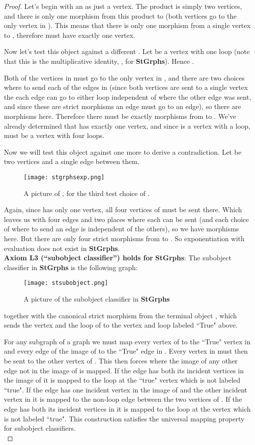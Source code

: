 \documentclass[11pt]{article}
\begin{document}
\begin{proof}
Let's begin with an  as just a vertex. The product  is simply two vertices, and there is only one morphism from this product to  (both vertices go to the only vertex in ). This means that there is only one morphism from a single vertex to , therefore  must have exactly one vertex.\par
Now let's test this object against a different . Let  be a vertex with one loop (note that this is the multiplicative identity, , for \textbf{StGrphs}). Hence .\par 
Both of the vertices in  must go to the only vertex in , and there are two choices where to send each of the edges in  (since both vertices are sent to a single vertex the each edge can go to either loop independent of where the other edge was sent, and since these are strict morphisms an edge must go to an edge), so there are  morphisms here. Therefore there must be exactly  morphisms from  to . We've already determined that  has exactly one vertex, and since  is a vertex with a loop,  must be a vertex with four loops.\par
Now we will test this object against one more  to derive a contradiction. Let  be two vertices and a single edge between them.\par
\begin{figure}[h]
\centering\texttt{[image: stgrphsexp.png]}
\caption{A picture of , for the third test choice of .}
\end{figure}
Again, since  has only one vertex, all four vertices of  must be sent there. Which leaves us with four edges and two places where each can be sent (and each choice of where to send an edge is independent of the others), so we have  morphisms here. But there are only four strict morphisms from  to . So exponentiation with evaluation does not exist in \textbf{StGrphs}.\\
\indent \textbf{Axiom L3 (``subobject classifier'') holds for} \textbf{StGrphs}: The subobject classifier in \textbf{StGrphs} is the following graph:\par
\begin{figure}[h]
\centering\texttt{[image: stsubobject.png]}
\caption{A picture of the subobject classifier  in \textbf{StGrphs}}
\end{figure}
together with the canonical strict morphism  from the terminal object , which sends the vertex and the loop of  to the vertex and loop labeled ``True" above.\par
For any subgraph  of a graph  we must map every vertex of  to the ``True" vertex in  and every edge of the image of  to the ``True" edge in . Every vertex in  must then be sent to the other vertex of . This then forces where the image of any other edge not in the image of  is mapped. If the edge has both its incident vertices in the image of  it is mapped to the loop at the ``true" vertex which is not labeled ``true". If the edge has one incident vertex in the image of  and the other incident vertex in  it is mapped to the non-loop edge between the two vertices of . If the edge has both its incident vertices in  it is mapped to the loop at the vertex which is not labeled ``true". This construction satisfies the universal mapping property for subobject classifiers.\\

\end{proof}
\end{document}
